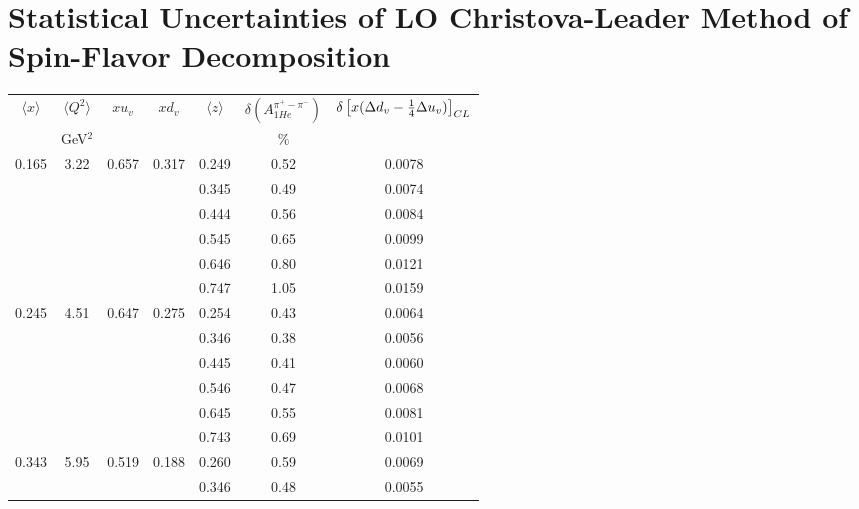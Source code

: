\section{ Statistical Uncertainties of LO Christova-Leader Method of Spin-Flavor Decomposition}
\begin{table}[htbp]
\begin{center}
\begin{tabular}{|ccccc||c|c|}
\hline
$\langle x \rangle $   & $ \langle Q^2 \rangle $   & $x  u_v$ & $x d_v$ & $\langle z \rangle$ & $\delta \left(A_{1He}^{\pi^+ - \pi^-} \right)$  &
$\delta \left[x( \Delta d_v -{1 \over 4} \Delta u_v )\right]_{CL}$  \\
                       & GeV$^2$              &          &    &       &  $\%$    &                                                              \\ \hline \hline
   0.165 &    3.22 &   0.657 &    0.317 &    0.249 &      0.52 &    0.0078 \\
         &          &          &          &    0.345 &      0.49 &    0.0074 \\
         &          &          &          &    0.444 &      0.56 &    0.0084 \\
         &          &          &          &    0.545 &      0.65 &    0.0099 \\
         &          &          &          &    0.646 &      0.80 &    0.0121 \\
         &          &          &          &    0.747 &      1.05 &    0.0159 \\
   0.245 &    4.51 &   0.647 &    0.275 &    0.254 &      0.43 &    0.0064 \\
         &          &          &          &    0.346 &      0.38 &    0.0056 \\
         &          &          &          &    0.445 &      0.41 &    0.0060 \\
         &          &          &          &    0.546 &      0.47 &    0.0068 \\
         &          &          &          &    0.645 &      0.55 &    0.0081 \\
         &          &          &          &    0.743 &      0.69 &    0.0101 \\
   0.343 &    5.95 &   0.519 &    0.188 &    0.260 &      0.59 &    0.0069 \\
         &          &          &          &    0.346 &      0.48 &    0.0055 \\

\end{tabular}
\end{center}
\end{table}

